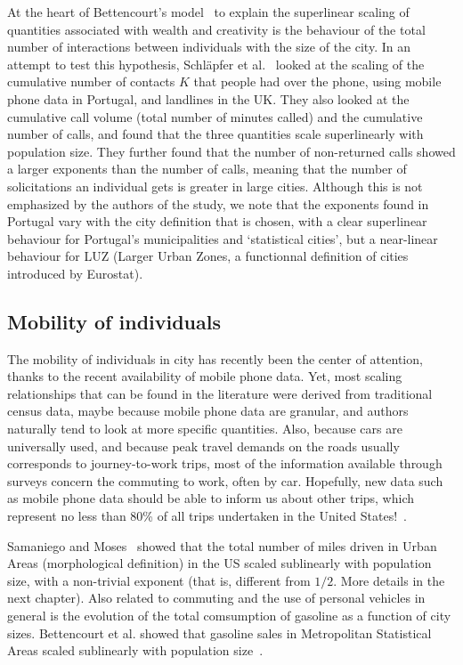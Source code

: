 At the heart of Bettencourt's model~\cite{Bettencourt:2013} to explain the
superlinear scaling of quantities associated with wealth and creativity is the
behaviour of the total number of interactions between individuals with the size
of the city. In an attempt to test this hypothesis, Schl\"apfer et
al.~\cite{Schlapfer:2014} looked at the scaling of the cumulative number of
contacts $K$ that people had over the phone, using mobile phone data in
Portugal, and landlines in the UK. They also looked at the cumulative call
volume (total number of minutes called) and the cumulative number of calls, and
found that the three quantities scale superlinearly with population size. They
further found that the number of non-returned calls showed a larger exponents
than the number of calls, meaning that the number of solicitations an individual
gets is greater in large cities.
Although this is not emphasized by the authors of the study, we note that the
exponents found in Portugal vary with the city definition that is chosen, with a
clear superlinear behaviour for Portugal's municipalities and `statistical
cities', but a near-linear behaviour for LUZ (Larger Urban Zones, a functionnal
definition of cities introduced by Eurostat).


\subsection{Mobility of individuals}
\label{sub:mobility}

The mobility of individuals in city has recently been the center of attention,
thanks to the recent availability of mobile phone data. Yet, most scaling
relationships that can be found in the literature were derived from traditional
census data, maybe because mobile phone data are granular, and authors naturally
tend to look at more specific quantities.
Also, because cars are universally used, and because peak travel demands on the
roads usually corresponds to journey-to-work trips, most of the information
available through surveys concern the commuting to work, often by car.
Hopefully, new data such as mobile phone data should be able to inform us about
other trips, which represent no less than 80\% of all trips undertaken in the
United States!~\cite{FHWA-PL-11-022}.

Samaniego and Moses~\cite{Samaniego:2008} showed that the total number of miles
driven in Urban Areas (morphological definition) in the US scaled sublinearly
with population size, with a non-trivial exponent (that is, different from
$1/2$. More details in the next chapter).  Also related to commuting and the use of
personal vehicles in general is the evolution of the total comsumption of
gasoline as a function of city sizes. Bettencourt et al. showed that gasoline
sales in Metropolitan Statistical Areas scaled sublinearly with population
size~\cite{Bettencourt:2007}. 

